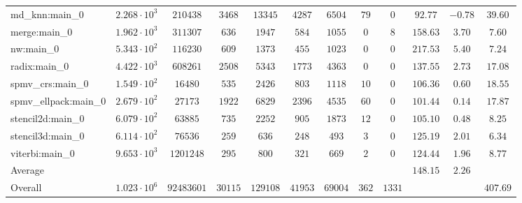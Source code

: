 \begin{tabular}{|l|c|c|c|c|c|c|c|c|c|c|c|}
md\_knn:main\_0        & $ 2.268 \cdot 10^{3} $ & $ 210438   $ & $ 3468  $ & $ 13345  $ & $ 4287  $ & $ 6504  $ & $ 79  $ & $ 0    $ & $ 92.77       $ & $ -0.78   $ & $ 39.60   $ \\
merge:main\_0          & $ 1.962 \cdot 10^{3} $ & $ 311307   $ & $ 636   $ & $ 1947   $ & $ 584   $ & $ 1055  $ & $ 0   $ & $ 8    $ & $ 158.63      $ & $ 3.70    $ & $ 7.60    $ \\
nw:main\_0             & $ 5.343 \cdot 10^{2} $ & $ 116230   $ & $ 609   $ & $ 1373   $ & $ 455   $ & $ 1023  $ & $ 0   $ & $ 0    $ & $ 217.53      $ & $ 5.40    $ & $ 7.24    $ \\
radix:main\_0          & $ 4.422 \cdot 10^{3} $ & $ 608261   $ & $ 2508  $ & $ 5343   $ & $ 1773  $ & $ 4363  $ & $ 0   $ & $ 0    $ & $ 137.55      $ & $ 2.73    $ & $ 17.08   $ \\
spmv\_crs:main\_0      & $ 1.549 \cdot 10^{2} $ & $ 16480    $ & $ 535   $ & $ 2426   $ & $ 803   $ & $ 1118  $ & $ 10  $ & $ 0    $ & $ 106.36      $ & $ 0.60    $ & $ 18.55   $ \\
spmv\_ellpack:main\_0  & $ 2.679 \cdot 10^{2} $ & $ 27173    $ & $ 1922  $ & $ 6829   $ & $ 2396  $ & $ 4535  $ & $ 60  $ & $ 0    $ & $ 101.44      $ & $ 0.14    $ & $ 17.87   $ \\
stencil2d:main\_0      & $ 6.079 \cdot 10^{2} $ & $ 63885    $ & $ 735   $ & $ 2252   $ & $ 905   $ & $ 1873  $ & $ 12  $ & $ 0    $ & $ 105.10      $ & $ 0.48    $ & $ 8.25    $ \\
stencil3d:main\_0      & $ 6.114 \cdot 10^{2} $ & $ 76536    $ & $ 259   $ & $ 636    $ & $ 248   $ & $ 493   $ & $ 3   $ & $ 0    $ & $ 125.19      $ & $ 2.01    $ & $ 6.34    $ \\
viterbi:main\_0        & $ 9.653 \cdot 10^{3} $ & $ 1201248  $ & $ 295   $ & $ 800    $ & $ 321   $ & $ 669   $ & $ 2   $ & $ 0    $ & $ 124.44      $ & $ 1.96    $ & $ 8.77    $ \\
\hline
Average                & $                    $ & $          $ & $       $ & $        $ & $       $ & $       $ & $     $ & $      $ & $ 148.15      $ & $ 2.26    $ & $         $ \\
\hline
Overall                & $ 1.023 \cdot 10^{6} $ & $ 92483601 $ & $ 30115 $ & $ 129108 $ & $ 41953 $ & $ 69004 $ & $ 362 $ & $ 1331 $ & $             $ & $         $ & $ 407.69  $ \\
\hline
\end{tabular}
